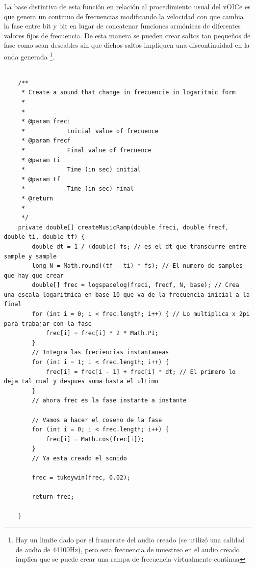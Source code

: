 \documentclass{article}
\numberwithin{figure}{section}
\begin{document}
    La base distintiva de esta función en relación al procedimiento usual del vOICe es que genera un continuo de frecuencias modificando la velocidad con que cambia la fase entre bit y bit en lugar de concatenar funciones armónicas de diferentes valores fijos de frecuencia. De esta manera se pueden crear saltos tan pequeños de fase como sean deseables sin que dichos saltos impliquen una discontinuidad en la onda generada \footnote{Hay un limite dado por el framerate del audio creado (se utilizó una calidad de audio de 44100Hz), pero esta frecuencia de muestreo en el audio creado implica que se puede crear una rampa de frecuencia virtualmente continua}. 
    
    \begin{minipage}{\textwidth}
    \begin{lstlisting}[caption=Código que genera una rampa de frecuencia que varia en forma continua. Cada una de estas rampas es la representación sonora equivalente a un segmento recto en la lógica del vOICe pero preservando la continuidad de la señal al cambiar en forma continua la frecuencia como se observa en la figura \ref{fig:rampaFrec}., label=code:rampa]
    
    /**
	 * Create a sound that change in frecuencie in logaritmic form
	 * 
	 * 
	 * @param freci
	 *            Inicial value of frecuence
	 * @param frecf
	 *            Final value of frecuence
	 * @param ti
	 *            Time (in sec) initial
	 * @param tf
	 *            Time (in sec) final
	 * @return
	 * 
	 */
	private double[] createMusicRamp(double freci, double frecf, double ti, double tf) {
		double dt = 1 / (double) fs; // es el dt que transcurre entre sample y sample
		long N = Math.round((tf - ti) * fs); // El numero de samples que hay que crear
		double[] frec = logspacelog(freci, frecf, N, base); // Crea una escala logaritmica en base 10 que va de la frecuencia inicial a la final
		for (int i = 0; i < frec.length; i++) { // Lo multiplica x 2pi para trabajar con la fase
			frec[i] = frec[i] * 2 * Math.PI;
		}
		// Integra las freciencias instantaneas
		for (int i = 1; i < frec.length; i++) {
			frec[i] = frec[i - 1] + frec[i] * dt; // El primero lo deja tal cual y despues suma hasta el ultimo
		}
		// ahora frec es la fase instante a instante

		// Vamos a hacer el coseno de la fase
		for (int i = 0; i < frec.length; i++) {
			frec[i] = Math.cos(frec[i]);
		}
		// Ya esta creado el sonido

		frec = tukeywin(frec, 0.02);

		return frec;

	}
	\end{lstlisting}
    \end{minipage}
\end{document}
